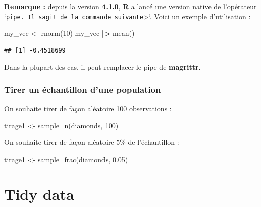 \documentclass[
]{book}
\newenvironment{Shaded}{\begin{snugshade}}{\end{snugshade}}
\newcommand{\DecValTok}[1]{\textcolor[rgb]{0.00,0.00,0.81}{#1}}
\newcommand{\ErrorTok}[1]{\textcolor[rgb]{0.64,0.00,0.00}{\textbf{#1}}}
\newcommand{\FloatTok}[1]{\textcolor[rgb]{0.00,0.00,0.81}{#1}}
\newcommand{\FunctionTok}[1]{\textcolor[rgb]{0.00,0.00,0.00}{#1}}
\newcommand{\NormalTok}[1]{#1}
\newcommand{\OtherTok}[1]{\textcolor[rgb]{0.56,0.35,0.01}{#1}}
\newcommand{\SpecialCharTok}[1]{\textcolor[rgb]{0.00,0.00,0.00}{#1}}
\theoremstyle{definition}
\theoremstyle{definition}
\theoremstyle{definition}
\theoremstyle{definition}
\theoremstyle{remark}
\begin{document}
\textbf{Remarque :} depuis la version \textbf{4.1.0}, \textbf{R} a lancé une version native de l'opérateur `\texttt{pipe\textquotesingle{}\textquotesingle{}.\ Il\ s\textquotesingle{}agit\ de\ la\ commande\ suivante}\textbar\textgreater`. Voici un exemple d'utilisation :

\begin{Shaded}
\begin{Highlighting}[]
\NormalTok{my\_vec }\OtherTok{\textless{}{-}} \FunctionTok{rnorm}\NormalTok{(}\DecValTok{10}\NormalTok{)}
\NormalTok{my\_vec }\SpecialCharTok{|}\ErrorTok{\textgreater{}}
  \FunctionTok{mean}\NormalTok{()}
\end{Highlighting}
\end{Shaded}

\begin{verbatim}
## [1] -0.4518699
\end{verbatim}

Dans la plupart des cas, il peut remplacer le pipe de \textbf{magrittr}.

\hypertarget{tirer-un-uxe9chantillon-dune-population}{%
\subsubsection{Tirer un échantillon d'une population}\label{tirer-un-uxe9chantillon-dune-population}}

On souhaite tirer de façon aléatoire 100 observations :

\begin{Shaded}
\begin{Highlighting}[]
\NormalTok{tirage1 }\OtherTok{\textless{}{-}} \FunctionTok{sample\_n}\NormalTok{(diamonds, }\DecValTok{100}\NormalTok{)}
\end{Highlighting}
\end{Shaded}

On souhaite tirer de façon aléatoire \(5\%\) de l'échantillon :

\begin{Shaded}
\begin{Highlighting}[]
\NormalTok{tirage1 }\OtherTok{\textless{}{-}} \FunctionTok{sample\_frac}\NormalTok{(diamonds, }\FloatTok{0.05}\NormalTok{)}
\end{Highlighting}
\end{Shaded}

\hypertarget{tidy-data}{%
\section{Tidy data}\label{tidy-data}}
\end{document}
